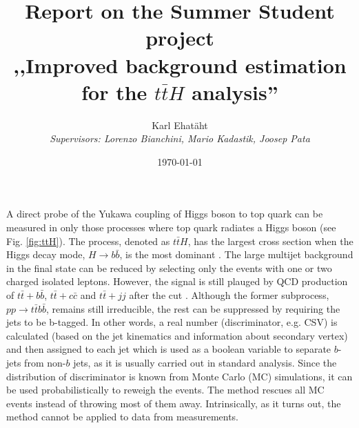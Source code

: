 \documentclass[12pt,a4paper]{article}
\title{\TitleFont\textbf{Report on the Summer Student project\\,,Improved background estimation for the $t\bar{t}H$ analysis''}}
\author{Karl Ehatäht\\[0.5em]
\textit{Supervisors: Lorenzo Bianchini, Mario Kadastik, Joosep Pata}}
\date\today
\begin{document}
\maketitle

A direct probe of the Yukawa coupling of Higgs boson to top quark can be measured in only those processes where top quark radiates a Higgs boson (see Fig. \ref{fig:ttH}).
The process, denoted as $t\bar{t}H$, has the largest cross section when the Higgs decay mode, $H \to b\bar{b}$, is the most dominant \cite{dittmaier2011handbook}.
The large multijet background in the final state  can be reduced by selecting only the events with one or two charged isolated leptons.
However, the signal is still plauged by QCD production of $t\bar{t}+b\bar{b}$, $t\bar{t}+c\bar{c}$ and $t\bar{t}+jj$ after the cut \cite{ATLASconference}.
Although the former subprocess, $pp\to t\bar{t}b\bar{b}$, remains still irreducible, the rest can be suppressed by requiring the jets to be b-tagged.
In other words, a real number (discriminator, e.g. CSV) is calculated (based on the jet kinematics and information about secondary vertex) and then assigned to each jet which is used as a boolean variable to separate $b$-jets from non-$b$ jets, as it is usually carried out in standard analysis.
Since the distribution of discriminator is known from Monte Carlo (MC) simulations, it can be used probabilistically to reweigh the events.
The method rescues all MC events instead of throwing most of them away.
Intrinsically, as it turns out, the method cannot be applied to data from measurements.
\vspace*{1em}
\end{document}
